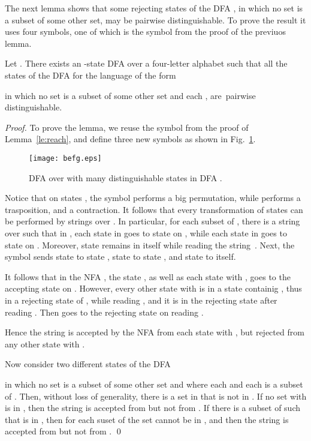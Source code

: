 \documentclass[runningheads]{llncs}
\begin{document}
The next lemma 
shows that some  rejecting states of the DFA , 
in which no set is a subset of some other set,
may be pairwise distinguishable.
To prove the result
it uses four symbols,
one of which is the symbol  from the proof of the previuos lemma.

\begin{lemma}\label{-----le4}\label{le:equiv}
 Let .
 There exists an -state DFA 
 over a four-letter  alphabet 
 such that all the states of the DFA  for the language 
 of the form
 
 in which no set is a subset of some other set and 
 each ,
 are~pairwise distinguishable.
\end{lemma} 

\begin{proof}
 To prove the lemma, we reuse the symbol 
 from the proof of Lemma~\ref{le:reach},
 and define three new symbols 
 as shown in Fig.~\ref{fig:befg}.

 \begin{figure}[t]\label{-----fig6}
 \centering
 \texttt{[image: befg.eps]}
 \caption{DFA  over  with many distinguishable states in 
         DFA .}
 \label{fig:befg}
 \end{figure}
 
 Notice that on states ,
 the symbol  performs a big permutation,
 while  performs a trasposition,
 and   a contraction.
 It follows that every transformation of states 
 can be performed by strings over .
 In particular, for each subset  of ,
 there is a string  over 
 such that in  ,
 each state in  goes to state  on ,
 while each state in  
 goes to state  on .
 Moreover, state  remains in itself while reading the string~.
 Next, the symbol  sends state  to state ,
 state  to state ,
 and state  to itself.

 It follows that in the NFA ,
 the  state ,
 as well as each state  with ,
 goes to the accepting state  on .
 However,
 every other state  with 
 is  in a state containig ,
 thus in a rejecting state of ,
 while reading , 
 and it is in the rejecting state 
 after reading .
 Then  goes to the rejecting state  on reading .
 
 Hence the string  is accepted by the NFA 
 from each state  with ,
 but rejected from any other state 
 with .
 
 Now consider  two different states of the DFA 
 
 in which no set is a subset of some other set and where
 each  and each  is a subset of .
 Then, without loss of generality,
 there is a set  in  that is not in .
 If no set  with  is in ,
 then the string 
 is accepted from  but not from .
 If there is a subset  of 
 such that  is  in ,
    then for each suset  of 
    the set   cannot be in ,
    and then the string  
 is accepted from  but not from .
\qed
\end{proof}
\end{document}
